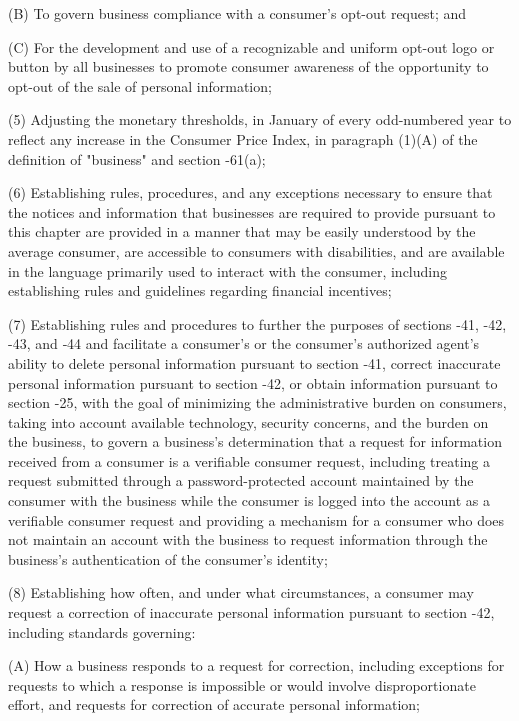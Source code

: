           (B)  To govern business compliance with a consumer's opt-out request; and

          (C)  For the development and use of a recognizable and uniform opt-out logo or button by all businesses to promote consumer awareness of the opportunity to opt-out of the sale of personal information;

     (5)  Adjusting the monetary thresholds, in January of every odd-numbered year to reflect any increase in the Consumer Price Index, in paragraph (1)(A) of the definition of "business" and section    -61(a);

     (6)  Establishing rules, procedures, and any exceptions necessary to ensure that the notices and information that businesses are required to provide pursuant to this chapter are provided in a manner that may be easily understood by the average consumer, are accessible to consumers with disabilities, and are available in the language primarily used to interact with the consumer, including establishing rules and guidelines regarding financial incentives;

     (7)  Establishing rules and procedures to further the purposes of sections    -41,    -42,    -43, and    ‑44 and facilitate a consumer's or the consumer's authorized agent's ability to delete personal information pursuant to section    -41, correct inaccurate personal information pursuant to section    -42, or obtain information pursuant to section    -25, with the goal of minimizing the administrative burden on consumers, taking into account available technology, security concerns, and the burden on the business, to govern a business's determination that a request for information received from a consumer is a verifiable consumer request, including treating a request submitted through a password-protected account maintained by the consumer with the business while the consumer is logged into the account as a verifiable consumer request and providing a mechanism for a consumer who does not maintain an account with the business to request information through the business's authentication of the consumer's identity;

     (8)  Establishing how often, and under what circumstances, a consumer may request a correction of inaccurate personal information pursuant to section    -42, including standards governing:

          (A)  How a business responds to a request for correction, including exceptions for requests to which a response is impossible or would involve disproportionate effort, and requests for correction of accurate personal information;

